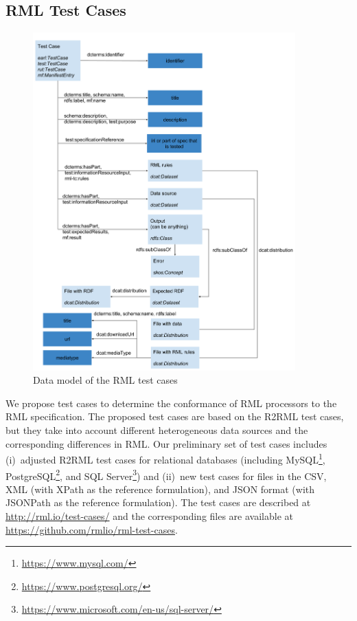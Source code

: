 \subsection{RML Test Cases}
\begin{figure}[!th]
\centering
\includegraphics[width=0.9\textwidth]{figures/rml_test_case_model.png}
\caption{Data model of the RML test cases}
\label{fig:datamodel}
\end{figure}

We propose test cases to determine the conformance of RML processors to the RML specification. The proposed test cases are based on the R2RML test cases, but they take into account different heterogeneous data sources and the corresponding differences in RML. Our preliminary set of test cases includes (i)~adjusted R2RML test cases for relational databases (including MySQL\footnote{\url{https://www.mysql.com/}}, PostgreSQL\footnote{\url{https://www.postgresql.org/}}, and SQL Server\footnote{\url{https://www.microsoft.com/en-us/sql-server/}}) and (ii)~new test cases for files in the CSV, XML (with XPath as the reference formulation), and JSON format (with JSONPath as the reference formulation). The test cases are described at \url{http://rml.io/test-cases/} and the corresponding files are available at \url{https://github.com/rmlio/rml-test-cases}.

